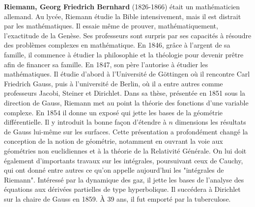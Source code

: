 \textbf{Riemann, Georg Friedrich Bernhard} (1826-1866) était un mathématicien allemand. Au lycée, Riemann étudie la Bible intensivement, mais il est distrait par les mathématiques. Il essaie même de prouver, mathématiquement, l'exactitude de la Genèse. Ses professeurs sont surpris par ses capacités à résoudre des problèmes complexes en mathématique. En 1846, grâce à l'argent de sa famille, il commence à étudier la philosophie et la théologie pour devenir prêtre afin de financer sa famille. En 1847, son père l'autorise à étudier les mathématiques. Il étudie d'abord à l'Université de Göttingen où il rencontre Carl Friedrich Gauss, puis à l'université de Berlin, où il a entre autres comme professeurs Jacobi, Steiner et Dirichlet. Dans sa thèse, présentée en 1851 sous la direction de Gauss, Riemann met au point la théorie des fonctions d'une variable complexe. En 1854 il donne un exposé qui jette les bases de la géométrie différentielle. Il y introduit la bonne façon d'étendre à $n$ dimensions les résultats de Gauss lui-même sur les surfaces. Cette présentation a profondément changé la conception de la notion de géométrie, notamment en ouvrant la voie aux géométries non euclidiennes et à la théorie de la Relativité Générale. On lui doit également d'importants travaux sur les intégrales, poursuivant ceux de Cauchy, qui ont donné entre autres ce qu'on appelle aujourd'hui les "intégrales de Riemann". Intéressé par la dynamique des gaz, il jette les bases de l'analyse des équations aux dérivées partielles de type hyperbolique. Il succédera à Dirichlet sur la chaire de Gauss en 1859. À 39 ans, il fut emporté par la tuberculose.

{}
\label{sec:S}

